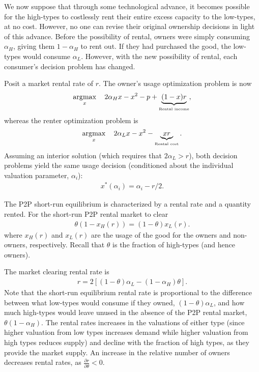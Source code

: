 \documentclass[11pt]{article}
\DeclareMathOperator*{\argmax}{\arg\!\max}
\begin{document}
We now suppose that through some technological advance, it becomes possible for the high-types to costlessly rent their entire excess capacity to the low-types, at no cost.
However, no one can revise their original ownership decisions in light of this advance. 
Before the possibility of rental, owners were simply consuming $\alpha_H$, giving them $1-\alpha_H$ to rent out.
If they had purchased the good, the low-types would consume $\alpha_L$. 
However, with the new possibility of rental, each consumer's decision problem has changed. 

Posit a market rental rate of $r$. 
The owner's usage optimization problem is now 
\begin{align}
\argmax_x \quad 2\alpha_H x - x^2 -p + \underbrace{(1-x)r}_{\mbox{{\tiny Rental income}}},   \nonumber 
\end{align} 
whereas the renter optimization problem is 
\begin{align}
\argmax_x \quad 2 \alpha_L x - x^2 - \underbrace{xr}_{\mbox{{\tiny Rental cost}}}.  \nonumber
\end{align} 
Assuming an interior solution (which requires that $2\alpha_L > r$), both decision problems yield the same usage decision (conditioned about the individual valuation parameter, $\alpha_i$): 
\begin{align}
x^*(\alpha_i) = \alpha_i - r/2. 
\end{align} 

The P2P short-run equilibrium is characterized by a rental rate and a quantity rented. 
For the short-run P2P rental market to clear 
\begin{align}
  \theta \left( 1 - x_H(r) \right) = (1-\theta) x_L(r).
\end{align}
where $x_H(r)$ and $x_L(r)$ are the usage of the good for the owners and non-owners, respectively.
Recall that $\theta$ is the fraction of high-types (and hence owners).

The market clearing rental rate is 
\begin{align} \label{eq:strr} 
r = 2\left[ (1-\theta)\alpha_L - (1-\alpha_H) \theta \right]. 
\end{align}
Note that the short-run equilibrium rental rate is proportional to the difference between what low-types would consume if they owned, $(1-\theta)\alpha_L$, and how much high-types would leave unused in the absence of the P2P rental market, $\theta (1-\alpha_H)$. 
The rental rates increases in the valuations of either type (since higher valuation from low types increases demand while higher valuation from high types reduces supply) and decline with the fraction of high types, as they provide the market supply. 
An increase in the relative number of owners decreases rental rates, as $\frac{\partial r}{\partial \theta} < 0$. 
\end{document}
